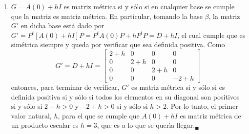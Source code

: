 \begin{solucion}
\begin{enumerate}[$a$)]
  \item $G = A(0) + hI$ es matriz m\'etrica si  y s\'olo si en cualquier base se cumple que la matriz es matriz m\'etrica. En particular, tomando la base $\beta$, la matriz $G'$ en dicha base est\'a dado por $G' = P^t\left[A(0)+hI\right]P = P^tA(0)P + hP^tP = D + hI$, el cual cumple que es sim\'etrica siempre y queda por verificar que sea definida positiva. Como 
  \begin{equation*}
   G' = D + hI = 
   \begin{bmatrix}
    2 + h & 0 & 0 & 0 \\
    0 & 2 + h & 0 & 0 \\
    0 & 0 & 2 + h & 0 \\
    0 & 0 & 0 & -2 + h
   \end{bmatrix}
  \end{equation*}
  entonces, para terminar de verificar, $G'$ es matriz m\'etrica si y s\'olo si es definida positiva si y s\'olo si todos los elementos en su diagonal son positivos si y s\'olo si $2+h > 0$ y $-2+h > 0$ si y s\'olo si $h > 2$. Por lo tanto, el primer valor natural, $h$, para el que se cumple que $A(0)+ hI$ es matriz m\'etrica de un producto escalar es $h = 3$, que es a lo que se quer\'{\i}a llegar.${}_{\blacksquare}$
 \end{enumerate}
\end{solucion}
